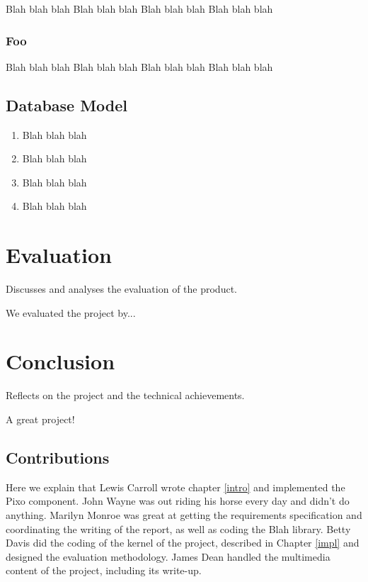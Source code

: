 \documentclass{lmproj}
\begin{document}
Blah blah blah
Blah blah blah
Blah blah blah
Blah blah blah

\subsection{Foo}

Blah blah blah
Blah blah blah
Blah blah blah
Blah blah blah

\section{Database Model}

\begin{enumerate}
\item Blah blah blah
\item Blah blah blah
\item Blah blah blah
\item Blah blah blah
\end{enumerate}



\chapter{Evaluation}

Discusses and analyses the evaluation of the product. 

We evaluated the project by...

\chapter{Conclusion}

Reflects on the project and the technical achievements.

A great project!

\section{Contributions}

Here we explain that Lewis Carroll wrote chapter \ref{intro} and implemented the Pixo component. 
John Wayne was out riding his horse every day and didn't do anything. Marilyn Monroe
was great at getting the requirements specification and coordinating the writing of the report, as well as coding the Blah library. Betty Davis did the coding of the kernel of the project, described in Chapter \ref{impl} and designed the evaluation methodology.  James Dean handled the multimedia content of the project, including its write-up.



\end{document}
